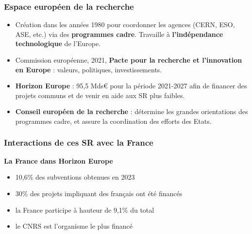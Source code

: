 \documentclass[xcolor=dvipsnames]{beamer}
\begin{document}
	\begin{frame}
		\frametitle{Espace européen de la recherche}
		\begin{itemize}
			\item Création dans les années 1980 pour coordonner les agences (CERN, ESO, ASE, etc.) via des \textbf{programmes cadre}. Travaille à \textbf{l'indépendance technologique} de l'Europe.
			\item Commission européenne, 2021, \textbf{Pacte pour la recherche et l'innovation en Europe} : valeurs, politiques, investissements.
			\item \textbf{Horizon Europe} : 95,5 Mds€ pour la période 2021-2027 afin de financer des projets communs et de venir en aide aux SR plus faibles.
			\item \textbf{Conseil européen de la recherche} : détermine les grandes orientations des programmes cadre, et assure la coordination des efforts des Etats.
		\end{itemize}
	\end{frame}
	\begin{frame}
		\frametitle{Interactions de ces SR avec la France}
		\textbf{La France dans Horizon Europe}
		\begin{itemize}
			\item 10,6\% des subventions obtenues en 2023
			\item 30\% des projets impliquant des français ont été financés
			\item la France participe à hauteur de 9,1\% du total
			\item le CNRS est l'organisme le plus financé
		\end{itemize}
	\end{frame}
\end{document}
